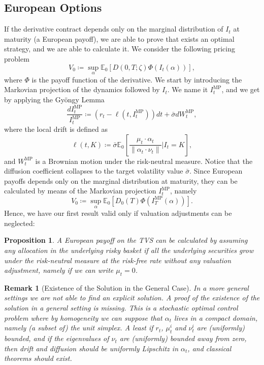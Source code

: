 \documentclass[11pt]{article}
\newtheorem{proposition}[theorem]{Proposition}
\newtheorem{remark}{Remark}[section]
\begin{document}
\subsection{European Options}
If the derivative contract depends only on the marginal distribution of $I_t$ at maturity (a European payoff), we are able to prove that exists an optimal strategy, and we are able to calculate it. We consider the following pricing problem
\begin{equation}
    V_0 \coloneqq \sup_\alpha \mathbb{E}_0\left[D(0,T;\zeta)\Phi(I_t(\alpha))\right],
\end{equation}
where $\Phi$ is the payoff function of the derivative. We start by introducing the Markovian projection of the dynamics followed by $I_t$. We name it $I_t^{\text{MP}}$, and we get by applying the Gy\"ongy Lemma
\begin{equation}
    \frac{dI_t^{\text{MP}}}{I_t^{\text{MP}}} \coloneqq \left(r_t - \ell \left(t,I_t^{\text{MP}}\right)\right)dt + \bar{\sigma}dW_t^{\text{MP}},
\label{eq:markovian_projection}\end{equation}
where the local drift is defined as
\begin{equation}
    \ell \left(t,K\right) \coloneqq \bar{\sigma} \mathbb{E}_0\left[\frac{\mu_t \cdot \alpha_t}{\|\alpha_t \cdot \nu_t \|}\bigg|I_t = K\right],
\end{equation}
and $W_t^{\text{MP}}$ is a Brownian motion under the risk-neutral measure. Notice that the diffusion coefficient collapses to the target volatility value $\bar{\sigma}$. Since European payoffs depends only on the marginal distribution at maturity, they can be calculated by means of the Markovian projection $I_t^{\text{MP}}$, namely
\begin{equation}
V_0 \coloneqq \sup_{\alpha} \mathbb{E}_0\left[D_0\left(T\right)\Phi\left(I_T^{\text{MP}}\left(\alpha\right)\right)\right].
\end{equation}
Hence, we have our first result valid only if valuation adjustments can be neglected:
\begin{proposition}
A European payoff on the TVS can be calculated by assuming any allocation in the underlying risky basket if all the underlying
securities grow under the risk-neutral measure at the risk-free rate without any valuation adjustment, namely if we can write $\mu_t=0$.
\end{proposition}
\begin{remark}[Existence of the Solution in the General Case]
In a more general settings we are not able to find an explicit solution. A proof of the existence of the solution in a general setting is missing. This is a stochastic optimal control problem where by homogeneity we can suppose that $\alpha_t$ lives in a compact domain, namely (a subset of) the unit simplex. A least if $r_t$, $\mu^i_t$ and $\nu^i_t$ are (uniformly) bounded, and if the eigenvalues of $\nu_t$ are (uniformly) bounded away from zero, then drift and diffusion should be uniformly Lipschitz in $\alpha_t$, and classical theorems should exist. 
\end{remark}
\end{document}
